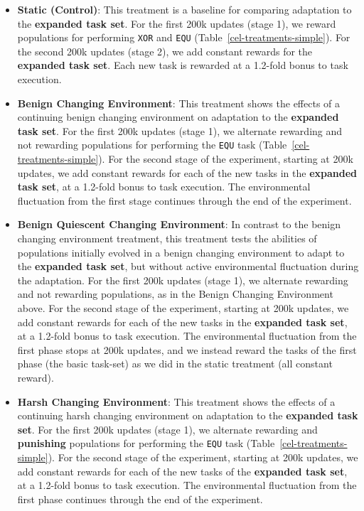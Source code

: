 \documentclass[10pt,letterpaper]{article}
\begin{document}
\begin{itemize}
	\item \textbf{Static (Control)}: This treatment is a baseline for comparing adaptation to the \textbf{expanded task set}. For the first 200k updates (stage 1), we reward populations for performing  \texttt{XOR} and \texttt{EQU} (Table~\ref{cel-treatments-simple}). For the second 200k updates (stage 2), we add constant rewards for the \textbf{expanded task set}. Each new task is rewarded at a 1.2-fold bonus to task execution.

	\item \textbf{Benign Changing Environment}: This treatment shows the effects of a continuing benign changing environment on adaptation to the \textbf{expanded task set}. For the first 200k updates (stage 1), we alternate rewarding and not rewarding populations for performing the \texttt{EQU} task (Table~\ref{cel-treatments-simple}). For the second stage of the experiment, starting at 200k updates, we add constant rewards for each of the new tasks in the \textbf{expanded task set}, at a 1.2-fold bonus to task execution. The environmental fluctuation from the first stage continues through the end of the experiment.

	\item \textbf{Benign Quiescent Changing Environment}: In contrast to the benign changing environment treatment, this treatment tests the abilities of populations initially evolved in a benign changing environment to adapt to the \textbf{expanded task set}, but without active environmental fluctuation during the adaptation. For the first 200k updates (stage 1), we alternate rewarding and not rewarding populations, as in the Benign Changing Environment above. For the second stage of the experiment, starting at 200k updates, we add constant rewards for each of the new tasks in the \textbf{expanded task set}, at a 1.2-fold bonus to task execution. The environmental fluctuation from the first phase stops at 200k updates, and we instead reward the tasks of the first phase (the basic task-set) as we did in the static treatment (all constant reward).

	\item \textbf{Harsh Changing Environment}: This treatment shows the effects of a continuing harsh changing environment on adaptation to the \textbf{expanded task set}. For the first 200k updates (stage 1), we alternate rewarding and \textbf{punishing} populations for performing the \texttt{EQU} task (Table~\ref{cel-treatments-simple}). For the second stage of the experiment, starting at 200k updates, we add constant rewards for each of the new tasks of the \textbf{expanded task set}, at a 1.2-fold bonus to task execution. The environmental fluctuation from the first phase continues through the end of the experiment.


\end{itemize}
\end{document}
